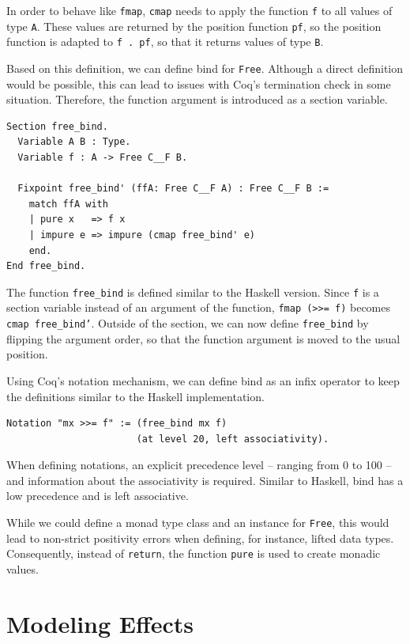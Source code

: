 \documentclass[a4paper, 11pt, fleqn, twoside, abstract=on]{scrreprt}
\newcommand{\hinl}[1]{\texttt{#1}}
\newcommand{\cinl}[1]{\texttt{#1}}
\begin{document}
In order to behave like \hinl{fmap}, \cinl{cmap} needs to apply the function \cinl{f} to all values of type \cinl{A}.
These values are returned by the position function \cinl{pf}, so the position function is adapted to \cinl{f . pf}, so that it returns values of type \cinl{B}.

Based on this definition, we can define bind for \cinl{Free}.
Although a direct definition would be possible, this can lead to issues with Coq's termination check in some situation.
Therefore, the function argument is introduced as a section variable.

\begin{verbatim}
Section free_bind.
  Variable A B : Type.
  Variable f : A -> Free C__F B.

  Fixpoint free_bind' (ffA: Free C__F A) : Free C__F B :=
    match ffA with
    | pure x   => f x
    | impure e => impure (cmap free_bind' e)
    end.
End free_bind.
\end{verbatim}
\noindent
The function \cinl{free_bind} is defined similar to the Haskell version.
Since \cinl{f} is a section variable instead of an argument of the function, \hinl{fmap (>>= f)} becomes \cinl{cmap free_bind'}.
Outside of the section, we can now define \cinl{free_bind} by flipping the argument order, so that the function argument is moved to the usual position.

Using Coq's notation mechanism, we can define bind as an infix operator to keep the definitions similar to the Haskell implementation.

\begin{verbatim}
Notation "mx >>= f" := (free_bind mx f)
                       (at level 20, left associativity).
\end{verbatim}

When defining notations, an explicit precedence level -- ranging from 0 to 100 -- and information about the associativity is required.
Similar to Haskell, bind has a low precedence and is left associative.

While we could define a monad type class and an instance for \cinl{Free}, this would lead to non-strict positivity errors when defining, for instance, lifted data types.
Consequently, instead of \hinl{return}, the function \cinl{pure} is used to create monadic values.

\section{Modeling Effects}
\end{document}
